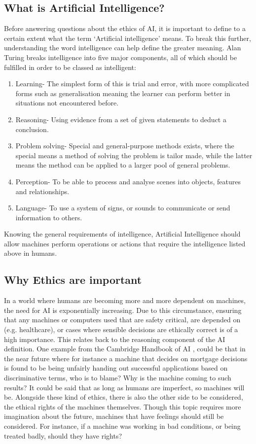 \documentclass[article]{IEEEtran}
\begin{document}
\subsection{What is Artificial Intelligence?}
Before answering questions about the ethics of AI, it is important to define to a certain extent what the term ‘Artificial intelligence’ means. To break this further, understanding the word intelligence can help define the greater meaning. Alan Turing \cite{Alan Turing website} breaks intelligence into five major components, all of which should be fulfilled in order to be classed as intelligent:
\begin{enumerate}
\item Learning- The simplest form of this is trial and error, with more complicated forms such as generalisation meaning the learner can perform better in situations not encountered before.
\item Reasoning- Using evidence from a set of given statements to deduct a conclusion.
\item Problem solving- Special and general-purpose methods exists, where the special means a method of solving the problem is tailor made, while the latter means the method can be applied to a larger pool of general problems.	
\item Perception- To be able to process and analyse scenes into objects, features and relationships.
\item Language- To use a system of signs, or sounds to communicate or send information to others. 
\end{enumerate}
Knowing the general requirements of intelligence, Artificial Intelligence should allow machines perform operations or actions that require the intelligence listed above in humans.

\subsection{Why Ethics are important}
In a world where humans are becoming more and more dependent on machines, the need for AI is exponentially increasing. Due to this circumstance, ensuring that any machines or computers used that are safety critical, are depended on (e.g. healthcare), or cases where sensible decisions are ethically correct is of a high importance. This relates back to the reasoning component of the AI definition. One example from the Cambridge Handbook of AI \cite{ethics important}, could be that in the near future where for instance a machine that decides  on mortgage decisions is found to be being unfairly handing out successful applications based on discriminative terms, who is to blame? Why is the machine coming to such results? It could be said that as long as humans are imperfect, so machines will be. 
Alongside these kind of ethics, there is also the other side to be considered, the ethical rights of the machines themselves. Though this topic requires more imagination about the future, machines that have feelings should still be considered. For instance, if a machine was working in bad conditions, or being treated badly, should they have rights?  
\end{document}
